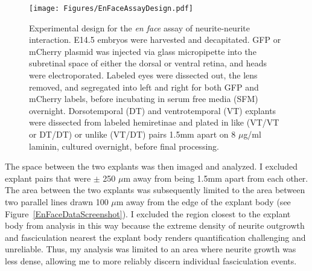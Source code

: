 \begin{figure}[hbtp]
    \begin{center}
        \texttt{[image: Figures/EnFaceAssayDesign.pdf]}
        \caption[Experimental design for the \emph{en face} assay of neurite-neurite interaction.]
        {Experimental design for the \emph{en face} assay of neurite-neurite interaction.
        E14.5 embryos were harvested and decapitated.
        GFP or mCherry plasmid was injected via glass micropipette into the subretinal space of either the dorsal or ventral retina, and heads were electroporated.
        Labeled eyes were dissected out, the lens removed, and segregated into left and right for both GFP and mCherry labels, before incubating in serum free media (SFM) overnight.
        Dorsotemporal (DT) and ventrotemporal (VT) explants were dissected from labeled hemiretinae and plated in like (VT/VT or DT/DT) or unlike (VT/DT) pairs 1.5mm apart on 8 $\mu$g/ml laminin, cultured overnight, before final processing.
        }
        \label{Figures/EnFaceAssayDesign}
    \end{center}
\end{figure}
The space between the two explants was then imaged and analyzed.
I excluded explant pairs that were $\pm$ 250 $\mu$m away from being 1.5mm apart from each other.
The area between the two explants was subsequently limited to the area between two parallel lines drawn 100 $\mu$m away from the edge of the explant body (see Figure~\ref{EnFaceDataScreenshot}).
I excluded the region closest to the explant body from analysis in this way because the extreme density of neurite outgrowth and fasciculation nearest the explant body renders quantification challenging and unreliable.
Thus, my analysis was limited to an area where neurite growth was less dense, allowing me to more reliably discern individual fasciculation events.
